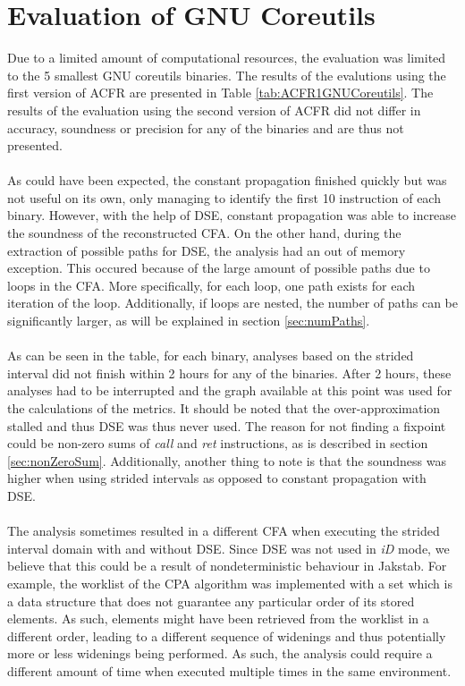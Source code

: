 \documentclass{kththesis}
\renewcommand{\it}[1]{\textit{#1}}
\begin{document}
\section{Evaluation of GNU Coreutils}\label{sec:evalGNU}
Due to a limited amount of computational resources, the evaluation was limited to the 5 smallest GNU coreutils binaries. The results of the evalutions using the first version of ACFR are presented in Table \ref{tab:ACFR1GNUCoreutils}. The results of the evaluation using the second version of ACFR did not differ in accuracy, soundness or precision for any of the binaries and are thus not presented.
\\ \\
As could have been expected, the constant propagation finished quickly but was not useful on its own, only managing to identify the first 10 instruction of each binary. However, with the help of DSE, constant propagation was able to increase the soundness of the reconstructed CFA. On the other hand, during the extraction of possible paths for DSE, the analysis had an out of memory exception. This occured because of the large amount of possible paths due to loops in the CFA. More specifically, for each loop, one path exists for each iteration of the loop. Additionally, if loops are nested, the number of paths can be significantly larger, as will be explained in section \ref{sec:numPaths}.
\\ \\
As can be seen in the table, for each binary, analyses based on the strided interval did not finish within 2 hours for any of the binaries. After 2 hours, these analyses had to be interrupted and the graph available at this point was used for the calculations of the metrics. It should be noted that the over-approximation stalled and thus DSE was thus never used. The reason for not finding a fixpoint could be non-zero sums of \it{call} and \it{ret} instructions, as is described in section \ref{sec:nonZeroSum}. Additionally, another thing to note is that the soundness was higher when using strided intervals as opposed to constant propagation with DSE. 
\\ \\
The analysis sometimes resulted in a different CFA when executing the strided interval domain with and without DSE. Since DSE was not used in \it{iD} mode, we believe that this could be a result of nondeterministic behaviour in Jakstab. For example, the worklist of the CPA algorithm was implemented with a set which is a data structure that does not guarantee any particular order of its stored elements. As such, elements might have been retrieved from the worklist in a different order, leading to a different sequence of widenings and thus potentially more or less widenings being performed. As such, the analysis could require a different amount of time when executed multiple times in the same environment. 
\end{document}
